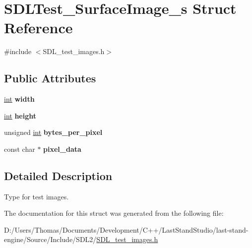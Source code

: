 \hypertarget{structSDLTest__SurfaceImage__s}{}\section{S\+D\+L\+Test\+\_\+\+Surface\+Image\+\_\+s Struct Reference}
\label{structSDLTest__SurfaceImage__s}


{\ttfamily \#include $<$S\+D\+L\+\_\+test\+\_\+images.\+h$>$}

\subsection*{Public Attributes}
\begin{DoxyCompactItemize}
\item 
\hypertarget{structSDLTest__SurfaceImage__s_a3cbacf6b015a22832ab4d3f509719609}{}\hyperlink{SDL__thread_8h_a6a64f9be4433e4de6e2f2f548cf3c08e}{int} {\bfseries width}\label{structSDLTest__SurfaceImage__s_a3cbacf6b015a22832ab4d3f509719609}

\item 
\hypertarget{structSDLTest__SurfaceImage__s_a310092874695556e4b7f1f63aec24213}{}\hyperlink{SDL__thread_8h_a6a64f9be4433e4de6e2f2f548cf3c08e}{int} {\bfseries height}\label{structSDLTest__SurfaceImage__s_a310092874695556e4b7f1f63aec24213}

\item 
\hypertarget{structSDLTest__SurfaceImage__s_a2daf91bab3d79fb9dfa25e8ade43e606}{}unsigned \hyperlink{SDL__thread_8h_a6a64f9be4433e4de6e2f2f548cf3c08e}{int} {\bfseries bytes\+\_\+per\+\_\+pixel}\label{structSDLTest__SurfaceImage__s_a2daf91bab3d79fb9dfa25e8ade43e606}

\item 
\hypertarget{structSDLTest__SurfaceImage__s_acf2d3006bea5690f564d3003d1512fa7}{}const char $\ast$ {\bfseries pixel\+\_\+data}\label{structSDLTest__SurfaceImage__s_acf2d3006bea5690f564d3003d1512fa7}

\end{DoxyCompactItemize}


\subsection{Detailed Description}
Type for test images. 

The documentation for this struct was generated from the following file\+:\begin{DoxyCompactItemize}
\item 
D\+:/\+Users/\+Thomas/\+Documents/\+Development/\+C++/\+Last\+Stand\+Studio/last-\/stand-\/engine/\+Source/\+Include/\+S\+D\+L2/\hyperlink{SDL__test__images_8h}{S\+D\+L\+\_\+test\+\_\+images.\+h}\end{DoxyCompactItemize}
